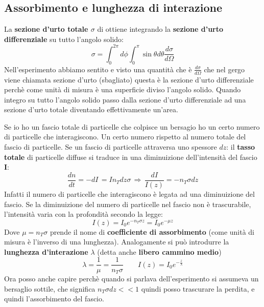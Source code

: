 \subsection{Assorbimento e lunghezza di interazione}
La \textbf{sezione d'urto totale $\sigma$} di ottiene integrando la \textbf{sezione d'urto differenziale} su tutto l'angolo solido:
\begin{equation*}
    \sigma=\int_{0}^{2\pi}d\phi \int_0^{\pi}\sin{\theta}d\theta\frac{d\sigma}{d\Omega}
\end{equation*}
Nell'esperimento abbiamo sentito e visto una quantità che è $\frac{d\sigma}{d\Omega}$ che nel gergo viene chiamata sezione d'urto (sbagliato) questa è la sezione d'urto differenziale perchè come unità di misura è una superficie diviso l'angolo solido. Quando integro su tutto l'angolo solido passo dalla sezione d'urto differenziale ad una sezione d'urto totale diventando effettivamente un'area. 

Se io ho un fascio totale di particelle che colpisce un bersagio ho un certo numero di particelle che interagiscono. Un certo numero rispetto al numero totale del fascio di particelle. Se un fascio di particelle attraversa uno spessore $dz$: il \textbf{tasso totale} di particelle diffuse si traduce in una diminuizione dell'intensità del fascio $\mathbf{I}$:
\begin{equation*}
    \frac{dn}{dt}=-dI\,=In_Tdz\sigma \,\Rightarrow\, \frac{dI}{I(z)}=-n_T\sigma dz
\end{equation*}
Infatti il numero di particelle che interagiscono è legata ad una diminuizione del fascio. Se la diminuizione del numero di particelle nel fascio non è trascurabile, l'intensità varia con la profondità secondo la legge:
\begin{equation*}
    I(z)=I_0e^{-n_T\sigma z}=I_0e^{-\mu z}
\end{equation*}
Dove $\mu=n_T\sigma$ prende il nome di \textbf{coefficiente di assorbimento} (come unità di misura è l'inverso di una lunghezza). Analogamente si può introdurre la \textbf{lunghezza d'interazione }$\lambda$ (detta anche \textbf{libero cammino medio})
\begin{equation*}
    \lambda=\frac{1}{\mu}=\frac{1}{n_T\sigma} \qquad I(z)=I_0e^{-\frac{z}{\lambda}}
\end{equation*}
Ora posso anche capire perchè quando si parlava dell'esperimento si assumeva un bersaglio sottile, che significa $n_T\sigma dz<<1$ quindi posso trascurare la perdita, e quindi l'assorbimento del fascio.

